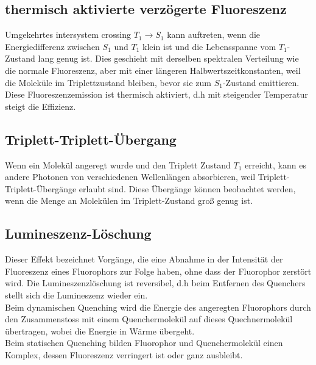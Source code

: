 \subsection{thermisch aktivierte verzögerte Fluoreszenz}
Umgekehrtes intersystem crossing $T_1 \rightarrow S_1$ kann auftreten, wenn die Energiedifferenz zwischen $S_1$ und $T_1$ klein ist und die Lebensspanne vom $T_1$-Zustand lang genug ist. Dies geschieht mit derselben spektralen Verteilung wie die normale Fluoreszenz, aber mit einer längeren Halbwertszeitkonstanten, weil die Moleküle im Triplettzustand bleiben, bevor sie zum $S_1$-Zustand emittieren. Diese Fluoreszenzemission ist thermisch aktiviert, d.h mit steigender Temperatur steigt die Effizienz.

\subsection{Triplett-Triplett-Übergang}
Wenn ein Molekül angeregt wurde und den Triplett Zustand $T_1$ erreicht, kann es andere Photonen von verschiedenen Wellenlängen absorbieren, weil Triplett-Triplett-Übergänge erlaubt sind. Diese Übergänge können beobachtet werden, wenn die Menge an Molekülen im Triplett-Zustand groß genug ist. \cite{[4]} %
\subsection{Lumineszenz-Löschung}
Dieser Effekt bezeichnet Vorgänge, die eine Abnahme in der Intensität der Fluoreszenz eines Fluorophors zur Folge haben, ohne dass der Fluorophor zerstört wird. Die Lumineszenzlöschung ist reversibel, d.h beim Entfernen des Quenchers stellt sich die Lumineszenz wieder ein.
\\Beim dynamischen Quenching wird die Energie des angeregten Fluorophors durch den Zusammenstoss mit einem Quenchermolekül auf dieses Quechnermolekül übertragen, wobei die Energie in Wärme übergeht.
\\Beim statischen Quenching bilden Fluorophor und Quenchermolekül einen Komplex, dessen Fluoreszenz verringert ist oder ganz ausbleibt. %